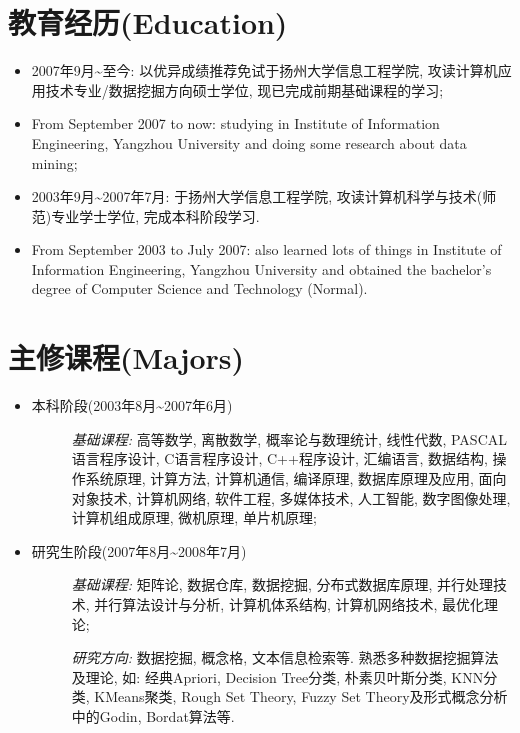 \documentclass[letterpaper,10pt,english]{manual}
\begin{document}
\section{教育经历(Education)}
\begin{itemize}
\item {} 
2007年9月\textasciitilde{}至今: 以优异成绩推荐免试于扬州大学信息工程学院, 攻读计算机应用技术专业/数据挖掘方向硕士学位, 现已完成前期基础课程的学习;

\item {} 
From September 2007 to now: studying in Institute of Information Engineering, Yangzhou University and doing some research about data mining;

\item {} 
2003年9月\textasciitilde{}2007年7月: 于扬州大学信息工程学院, 攻读计算机科学与技术(师范)专业学士学位, 完成本科阶段学习.

\item {} 
From September 2003 to July 2007: also learned lots of things in Institute of Information Engineering, Yangzhou University and obtained the bachelor's degree of Computer Science and Technology (Normal).

\end{itemize}


\section{主修课程(Majors)}
\begin{itemize}
\item {} \begin{description}
\item[本科阶段(2003年8月\textasciitilde{}2007年6月)]
\emph{基础课程:} 高等数学, 离散数学, 概率论与数理统计, 线性代数, PASCAL语言程序设计, C语言程序设计, C++程序设计, 汇编语言, 数据结构, 操作系统原理, 计算方法, 计算机通信, 编译原理, 数据库原理及应用, 面向对象技术, 计算机网络, 软件工程, 多媒体技术, 人工智能, 数字图像处理, 计算机组成原理, 微机原理, 单片机原理;

\end{description}

\item {} \begin{description}
\item[研究生阶段(2007年8月\textasciitilde{}2008年7月)]
\emph{基础课程:} 矩阵论, 数据仓库, 数据挖掘, 分布式数据库原理, 并行处理技术, 并行算法设计与分析, 计算机体系结构, 计算机网络技术, 最优化理论;

\emph{研究方向:} 数据挖掘, 概念格, 文本信息检索等. 熟悉多种数据挖掘算法及理论, 如: 经典Apriori, Decision Tree分类, 朴素贝叶斯分类, KNN分类, KMeans聚类, Rough Set Theory, Fuzzy Set Theory及形式概念分析中的Godin, Bordat算法等.

\end{description}

\end{itemize}
\end{document}
